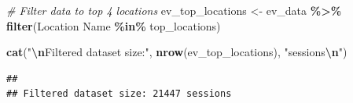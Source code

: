 \documentclass[
  12pt,
]{article}
\newenvironment{Shaded}{\begin{snugshade}}{\end{snugshade}}
\newcommand{\AttributeTok}[1]{\textcolor[rgb]{0.13,0.29,0.53}{#1}}
\newcommand{\CommentTok}[1]{\textcolor[rgb]{0.56,0.35,0.01}{\textit{#1}}}
\newcommand{\FunctionTok}[1]{\textcolor[rgb]{0.13,0.29,0.53}{\textbf{#1}}}
\newcommand{\NormalTok}[1]{#1}
\newcommand{\OtherTok}[1]{\textcolor[rgb]{0.56,0.35,0.01}{#1}}
\newcommand{\SpecialCharTok}[1]{\textcolor[rgb]{0.81,0.36,0.00}{\textbf{#1}}}
\newcommand{\StringTok}[1]{\textcolor[rgb]{0.31,0.60,0.02}{#1}}
\begin{document}
\begin{Shaded}
\begin{Highlighting}[]
\CommentTok{\# Filter data to top 4 locations}
\NormalTok{ev\_top\_locations }\OtherTok{\textless{}{-}}\NormalTok{ ev\_data }\SpecialCharTok{\%\textgreater{}\%}
    \FunctionTok{filter}\NormalTok{(}\StringTok{\textasciigrave{}}\AttributeTok{Location Name}\StringTok{\textasciigrave{}} \SpecialCharTok{\%in\%}\NormalTok{ top\_locations)}

\FunctionTok{cat}\NormalTok{(}\StringTok{"}\SpecialCharTok{\textbackslash{}n}\StringTok{Filtered dataset size:"}\NormalTok{, }\FunctionTok{nrow}\NormalTok{(ev\_top\_locations), }\StringTok{"sessions}\SpecialCharTok{\textbackslash{}n}\StringTok{"}\NormalTok{)}
\end{Highlighting}
\end{Shaded}

\begin{verbatim}
## 
## Filtered dataset size: 21447 sessions
\end{verbatim}
\end{document}
